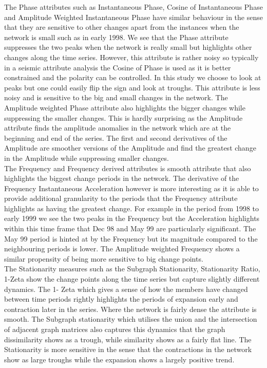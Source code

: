 The Phase attributes such as Instantaneous Phase, Cosine of Instantaneous Phase and Amplitude Weighted Instantaneous Phase have similar behaviour in the sense that they are sensitive to other changes apart from the instances when the network is small such as in early 1998. We see that the Phase attribute suppresses the two peaks when the network is really small but highlights other changes along the time series. However, this attribute is rather noisy so typically in a seismic attribute analysis the Cosine of Phase is used as it is better constrained and the polarity can be controlled. In this study we choose to look at peaks but one could easily flip the sign and look at troughs. This attribute is less noisy and is sensitive to the big and small changes in the network. The Amplitude weighted Phase attribute also highlights the bigger changes while suppressing the smaller changes. This is hardly surprising as the Amplitude attribute finds the amplitude anomalies in the network which are at the beginning and end of the series. The first and second derivatives of the Amplitude are smoother versions of the Amplitude and find the greatest change in the Amplitude while suppressing smaller changes. \\

The Frequency and Frequency derived attributes is smooth attribute that also highlights the biggest change periods in the network. The derivative of the Frequency Instantaneous Acceleration however is more interesting as it is able to provide additional granularity to the periods that the Frequency attribute highlights as having the greatest change. For example in the period from 1998 to early 1999 we see the two peaks in the Frequency but the Acceleration highlights within this time frame that Dec 98 and May 99 are particularly significant. The May 99 period is hinted at by the Frequency but its magnitude compared to the neighbouring periods is lower. The Amplitude weighted Frequency shows a similar propensity of being more sensitive to big change points.\\

The Stationarity measures such as the Subgraph Stationarity, Stationarity Ratio, 1-Zeta show the change points along the time series but capture slightly different dynamics. The 1- Zeta which gives a sense of how the members have changed between time periods rightly highlights the periods of expansion early and contraction later in the series. Where the network is fairly dense the attribute is smooth. The Subgraph stationarity which utilises the union and the intersection of adjacent graph matrices also captures this dynamics that the graph dissimilarity shows as a trough, while similarity shows as a fairly flat line. The Stationarity is more sensitive in the sense that the contractions in the network show as large troughs while the expansion shows a largely positive trend. \\

